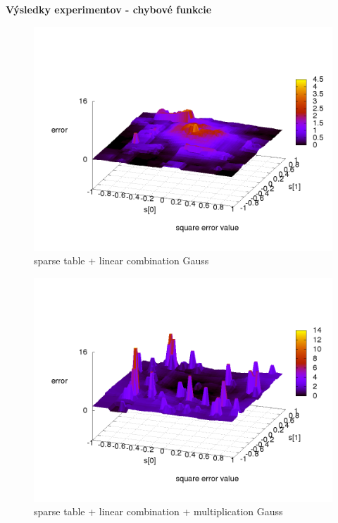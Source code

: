 \documentclass[xcolor=dvipsnames]{beamer}
\begin{document}
\begin{frame}{\bf Výsledky experimentov - chybové funkcie}

\begin{minipage}{.5\textwidth}

\begin{figure}[!htb]
\centering
\includegraphics[scale=.2]{../../results_q_learning/map_1/function_type_3/q_learning_error.png}
\caption{sparse table + linear combination Gauss}
\end{figure}


\end{minipage}%
\begin{minipage}{.5\textwidth}

\begin{figure}[!htb]
\centering
\includegraphics[scale=.2]{../../results_q_learning/map_1/function_type_4/q_learning_error.png}
\caption{sparse table + linear combination + multiplication Gauss}
\end{figure}


\end{minipage}
\end{frame}
\end{document}
